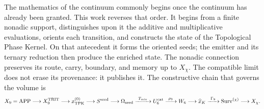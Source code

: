 The mathematics of the continuum commonly begins once the continuum has already been
granted. This work reverses that order. It begins from a finite nonadic support,
distinguishes upon it the additive and multiplicative evaluations, orients each
transition, and constructs the state of the Topological Phase Kernel. On that
antecedent it forms the oriented seeds; the emitter and its ternary reduction
then produce the enriched state. The nonadic connection preserves its
route, carry, boundary, and memory up to \(X_\chi\). The compatible
limit does not erase its provenance: it publishes it. The constructive chain that
governs the volume is
\begin{equation}\label{eq:front-cadena-causal-completa}
 X_9=\mathrm{APP}\longrightarrow X_9^{\rm TRIT}
 \longrightarrow x_{\rm TPK}^{(0)}
 \longrightarrow S^{\rm seed}
 \longrightarrow \Omega_{\rm seed}
 \xrightarrow{\ T_{\min}\ }U_6^{\rm cat}
 \xrightarrow{\ \rho_3\ }W_6
 \longrightarrow \widehat x_K
 \xrightarrow{\ \Gamma_9\ }
 \operatorname{Surv}^{(\chi)}
 \longrightarrow X_\chi .
\end{equation}
